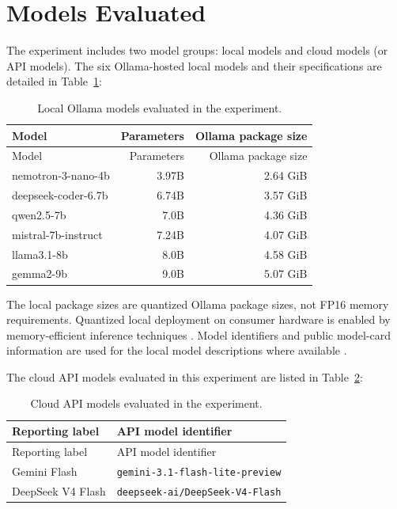 \section{Models Evaluated\label{sec:models}}

The experiment includes two model groups: local models and cloud models (or API models). The six Ollama-hosted local models and their specifications are detailed in Table~\ref{tab:local-models}:

\begin{longtable}[]{@{}lrr@{}}
\caption{Local Ollama models evaluated in the experiment.}\label{tab:local-models}\tabularnewline
\toprule\noalign{}
Model & Parameters & Ollama package size \\
\midrule\noalign{}
\endfirsthead
\toprule\noalign{}
Model & Parameters & Ollama package size \\
\midrule\noalign{}
\endhead
\bottomrule\noalign{}
\endlastfoot
nemotron-3-nano-4b & 3.97B & 2.64 GiB \\
deepseek-coder-6.7b & 6.74B & 3.57 GiB \\
qwen2.5-7b & 7.0B & 4.36 GiB \\
mistral-7b-instruct & 7.24B & 4.07 GiB \\
llama3.1-8b & 8.0B & 4.58 GiB \\
gemma2-9b & 9.0B & 5.07 GiB \\
\end{longtable}

The local package sizes are quantized Ollama package sizes, not FP16 memory requirements. Quantized local deployment on consumer hardware is enabled by memory-efficient inference techniques \cite{alizadeh2023llmflash}. Model identifiers and public model-card information are used for the local model descriptions where available \cite{nemotron3nano2026, deepseekcoder2023, qwen25release2024, mistral7b2023, llama31modelcard2024, gemma2release2024}.

The cloud API models evaluated in this experiment are listed in Table~\ref{tab:api-models}:

\begin{longtable}[]{@{}ll@{}}
\caption{Cloud API models evaluated in the experiment.}\label{tab:api-models}\tabularnewline
\toprule\noalign{}
Reporting label & API model identifier \\
\midrule\noalign{}
\endfirsthead
\toprule\noalign{}
Reporting label & API model identifier \\
\midrule\noalign{}
\endhead
\bottomrule\noalign{}
\endlastfoot
Gemini Flash & \texttt{gemini-3.1-flash-lite-preview} \\
DeepSeek V4 Flash & \texttt{deepseek-ai/DeepSeek-V4-Flash} \\
\end{longtable}

